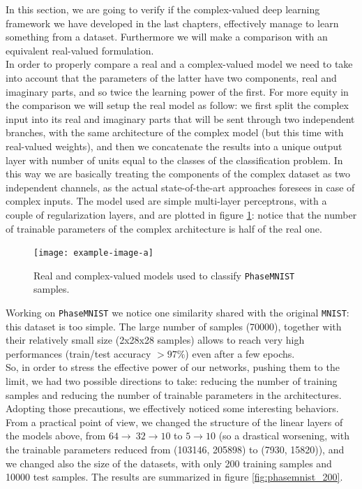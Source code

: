 \documentclass[../main.tex]{subfiles}
\begin{document}
In this section, we are going to verify if the complex-valued deep learning framework we have developed in the last chapters, effectively manage to learn something from a dataset. Furthermore we will make a comparison with an equivalent real-valued formulation.\\
In order to properly compare a real and a complex-valued model we need to take into account that the parameters of the latter have two components, real and imaginary parts, and so twice the learning power of the first. For more equity in the comparison we will setup the real model as follow: we first split the complex input into its real and imaginary parts that will be sent through two independent branches, with the same architecture of the complex model (but this time with real-valued weights), and then we concatenate the results into a unique output layer with number of units equal to the classes of the classification problem. In this way we are basically treating the components of the complex dataset as two independent channels, as the actual state-of-the-art approaches foresees in case of complex inputs. The model used are simple multi-layer perceptrons, with a couple of regularization layers, and are plotted in figure \ref{fig:phasemnist_models}: notice that the number of trainable parameters of the complex architecture is half of the real one.
\begin{figure}[!ht]
	\centering
	\texttt{[image: example-image-a]}
	\caption{Real and complex-valued models used to classify \texttt{PhaseMNIST} samples.}
	\label{fig:phasemnist_models}
\end{figure}
Working on \texttt{PhaseMNIST} we notice one similarity shared with the original \texttt{MNIST}: this dataset is too simple. The large number of samples (70000), together with their relatively small size (2x28x28 samples) allows to reach very high performances (train/test accuracy $>97\%$) even after a few epochs.\\
So, in order to stress the effective power of our networks, pushing them to the limit, we had two possible directions to take: reducing the number of training samples and reducing the number of trainable parameters in the architectures. Adopting those precautions, we effectively noticed some interesting behaviors. From a practical point of view, we changed the structure of the linear layers of the models above, from $64\to\ 32\to 10$ to $5\to 10$ (so a drastical worsening, with the trainable parameters reduced from (103146, 205898) to (7930, 15820)), and we changed also the size of the datasets, with only 200 training samples and 10000 test samples. The results are summarized in figure \ref{fig:phasemnist_200}.
\end{document}
